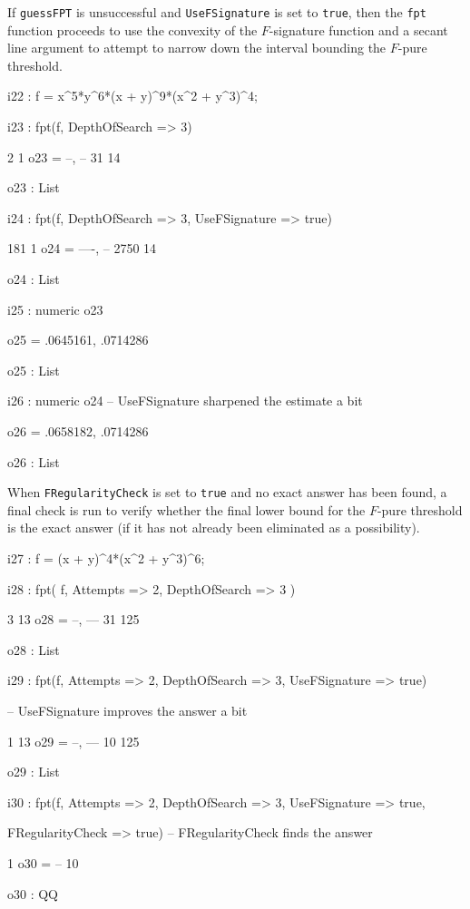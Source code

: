 \documentclass{amsart}
\begin{document}
If {\tt guessFPT} is unsuccessful and {\tt UseFSignature} is set to {\tt true}, then the {\tt fpt} function proceeds to use the convexity of the $F$-signature function and a secant line argument to attempt to narrow down the interval bounding the $F$-pure threshold.

{\small
{}
\begin{MyVerbatim}

i22 : f = x^5*y^6*(x + y)^9*(x^2 + y^3)^4;

i23 : fpt(f, DepthOfSearch => 3)

        2   1
o23 = {--, --}
       31  14

o23 : List

i24 : fpt(f, DepthOfSearch => 3, UseFSignature => true)

        181   1
o24 = {----, --}
       2750  14

o24 : List

i25 : numeric o23

o25 = {.0645161, .0714286}

o25 : List

i26 : numeric o24 -- UseFSignature sharpened the estimate a bit

o26 = {.0658182, .0714286}

o26 : List
\end{MyVerbatim}
}
\medspace

When {\tt FRegularityCheck} is set to {\tt true} and no exact answer has been found, a final check is run to verify whether the final lower bound for the $F$-pure threshold is the exact answer (if it has not already been eliminated as a possibility).

{\small
{}
\begin{MyVerbatim}

i27 : f = (x + y)^4*(x^2 + y^3)^6;

i28 : fpt( f, Attempts => 2, DepthOfSearch => 3 )

        3   13
o28 = {--, ---}
       31  125

o28 : List

i29 : fpt(f, Attempts => 2, DepthOfSearch => 3, UseFSignature => true) 

      -- UseFSignature improves the answer a bit

        1   13
o29 = {--, ---}
       10  125

o29 : List

i30 : fpt(f, Attempts => 2, DepthOfSearch => 3, UseFSignature => true,

      FRegularityCheck => true) -- FRegularityCheck finds the answer

       1
o30 = --
      10

o30 : QQ
\end{MyVerbatim}
}
\medspace
\end{document}
